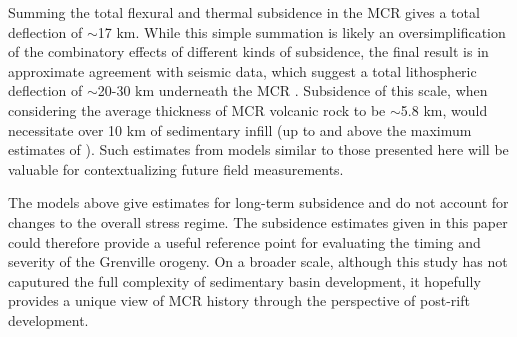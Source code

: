 \documentclass[12pt,letterpaper]{article}
\begin{document}
Summing the total flexural and thermal subsidence in the MCR gives a total deflection of $\sim$17 km. While this simple summation is likely an oversimplification of the combinatory effects of different kinds of subsidence, the final result is in approximate agreement with seismic data, which suggest a total lithospheric deflection of $\sim$20-30 km underneath the MCR \citep{Ojakangas2001a}. Subsidence of this scale, when considering the average thickness of MCR volcanic rock to be $\sim$5.8 km, would necessitate over 10 km of sedimentary infill (up to and above the maximum estimates of \cite{Ojakangas2001a}). Such estimates from models similar to those presented here will be valuable for contextualizing future field measurements.\par

The models above give estimates for long-term subsidence and do not account for changes to the overall stress regime. The subsidence estimates given in this paper could therefore provide a useful reference point for evaluating the timing and severity of the Grenville orogeny. On a broader scale, although this study has not caputured the full complexity of sedimentary basin development, it hopefully provides a unique view of MCR history through the perspective of post-rift development. 
\end{document}
